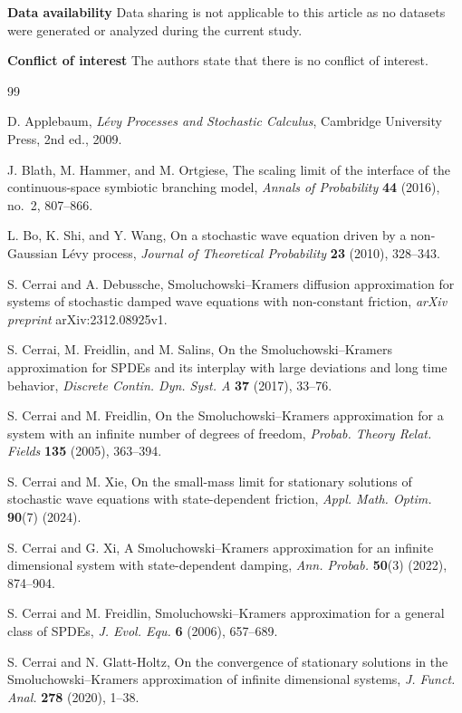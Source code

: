 \documentclass[11pt]{article}
\theoremstyle{plain}
\numberwithin{equation}{section}
\begin{document}
{\bf  Data availability}   Data sharing is not applicable to this article as no datasets were generated or analyzed during the current study.


{\bf Conflict of interest}  The authors state that there is no conflict of interest.
\begin{thebibliography}{99}

D. Applebaum,
\emph{L\'evy Processes and Stochastic Calculus},
Cambridge University Press, 2nd ed., 2009.

 
J. Blath, M. Hammer, and M. Ortgiese,
The scaling limit of the interface of the continuous-space symbiotic branching model,
\emph{Annals of Probability} \textbf{44} (2016), no.~2, 807--866.



L. Bo, K. Shi, and Y. Wang,
On a stochastic wave equation driven by a non-Gaussian L\'evy process,
\emph{Journal of Theoretical Probability} \textbf{23} (2010), 328--343.

 
S. Cerrai and A. Debussche,
Smoluchowski--Kramers diffusion approximation for systems of stochastic damped wave equations with non-constant friction,
\emph{arXiv preprint} arXiv:2312.08925v1.

S. Cerrai, M. Freidlin, and M. Salins,
On the Smoluchowski--Kramers approximation for SPDEs and its interplay with large deviations and long time behavior,
\emph{Discrete Contin. Dyn. Syst. A} \textbf{37} (2017), 33--76.

S. Cerrai and M. Freidlin,
On the Smoluchowski--Kramers approximation for a system with an infinite number of degrees of freedom,
\emph{Probab. Theory Relat. Fields} \textbf{135} (2005), 363--394.

S. Cerrai and M. Xie,
On the small-mass limit for stationary solutions of stochastic wave equations with state-dependent friction,
\emph{Appl. Math. Optim.} \textbf{90}(7) (2024).

S. Cerrai and G. Xi,
A Smoluchowski--Kramers approximation for an infinite dimensional system with state-dependent damping,
\emph{Ann. Probab.} \textbf{50}(3) (2022), 874--904.

S. Cerrai and M. Freidlin,
Smoluchowski--Kramers approximation for a general class of SPDEs,
\emph{J. Evol. Equ.} \textbf{6} (2006), 657--689.

S. Cerrai and N. Glatt-Holtz,
On the convergence of stationary solutions in the Smoluchowski--Kramers approximation of infinite dimensional systems,
\emph{J. Funct. Anal.} \textbf{278} (2020), 1--38.


\end{thebibliography}
\end{document}
